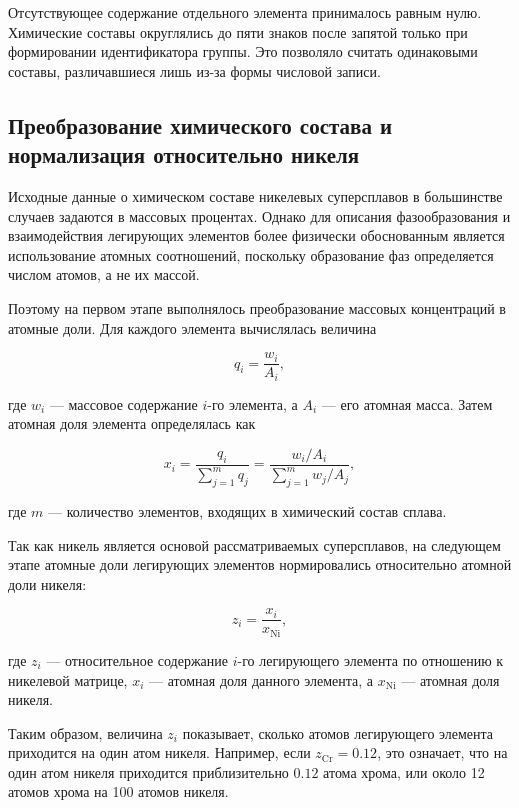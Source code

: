 Отсутствующее содержание отдельного элемента принималось равным нулю.
Химические составы округлялись до пяти знаков после запятой только при
формировании идентификатора группы. Это позволяло считать одинаковыми
составы, различавшиеся лишь из-за формы числовой записи.

\subsection{Преобразование химического состава и нормализация относительно никеля}

Исходные данные о химическом составе никелевых суперсплавов в 
большинстве случаев задаются в массовых процентах. Однако для 
описания фазообразования и взаимодействия легирующих элементов 
более физически обоснованным является использование атомных 
соотношений, поскольку образование фаз определяется числом атомов, а 
не их массой.

Поэтому на первом этапе выполнялось преобразование массовых 
концентраций в атомные доли. Для каждого элемента вычислялась 
величина

\begin{equation}
q_i = \frac{w_i}{A_i},
\end{equation}

где $w_i$ --- массовое содержание $i$-го элемента, 
а $A_i$ --- его атомная масса. Затем атомная доля элемента 
определялась как

\begin{equation}
x_i =
\frac{q_i}
{\sum\limits_{j=1}^{m} q_j}
=
\frac{w_i/A_i}
{\sum\limits_{j=1}^{m} w_j/A_j},
\end{equation}

где $m$ --- количество элементов, входящих в химический состав сплава.

Так как никель является основой рассматриваемых суперсплавов, 
на следующем этапе атомные доли легирующих элементов нормировались 
относительно атомной доли никеля:

\begin{equation}
z_i =
\frac{x_i}{x_{\mathrm{Ni}}},
\end{equation}

где $z_i$ --- относительное содержание $i$-го легирующего элемента по 
отношению к никелевой матрице, $x_i$ --- атомная доля данного элемента, 
а $x_{\mathrm{Ni}}$ --- атомная доля никеля.

Таким образом, величина $z_i$ показывает, сколько атомов легирующего 
элемента приходится на один атом никеля. Например, если $z_{\mathrm{Cr}} = 0.12$, 
это означает, что на один атом никеля приходится приблизительно $0.12$ 
атома хрома, или около 12 атомов хрома на 100 атомов никеля.

